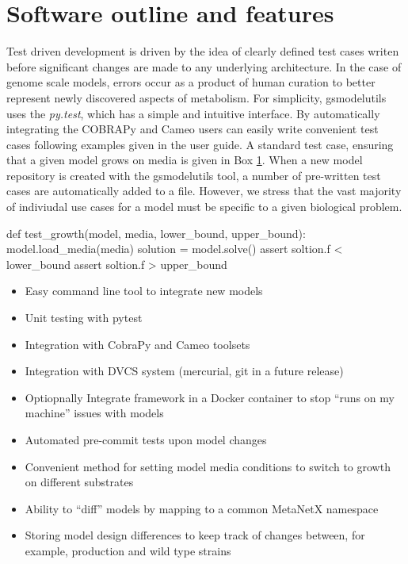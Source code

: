 \documentclass{bioinfo}
\begin{document}
\section{Software outline and features}
Test driven development is driven by the idea of clearly defined test cases writen before significant changes are made to any underlying architecture.
In the case of genome scale models, errors occur as a product of human curation to better represent newly discovered aspects of metabolism.
For simplicity, gsmodelutils uses the \textit{py.test}, which has a simple and intuitive interface.
By automatically integrating the COBRAPy \cite{} and Cameo \cite{} users can easily write convenient test cases following examples given in the user guide.
A standard test case, ensuring that a given model grows on media is given in Box \ref{}.
When a new model repository is created with the gsmodelutils tool, a number of pre-written test cases are automatically added to a file.
However, we stress that the vast majority of indiviudal use cases for a model must be specific to a given biological problem.

\begin{verbatim*}
def test_growth(model, media, lower_bound, upper_bound):
    model.load_media(media)
    solution = model.solve()
    assert soltion.f < lower_bound
    assert soltion.f > upper_bound
\end{verbatim*}




\begin{itemize}
 \item Easy command line tool to integrate new models
 \item Unit testing with pytest
 \item Integration with CobraPy and Cameo toolsets
 \item Integration with DVCS system (mercurial, git in a future release)
  \item Optiopnally Integrate framework in a Docker container to stop ``runs on my machine'' issues with models
 \item Automated pre-commit tests upon model changes
 \item Convenient method for setting model media conditions to switch to growth on different substrates
 \item Ability to ``diff'' models by mapping to a common MetaNetX namespace
 \item Storing model design differences to keep track of changes between, for example, production and wild type strains
\end{itemize}
\end{document}
